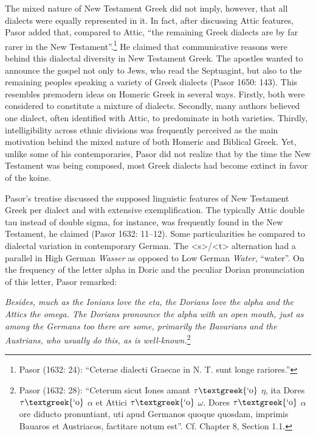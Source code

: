 \begin{styleStandard}
The mixed nature of New Testament Greek did not imply, however, that all dialects were equally represented in it. In fact, after discussing Attic features, Pasor added that, compared to Attic, “the remaining Greek dialects are by far rarer in the New Testament”.\footnote{ Pasor (1632: 24): “Ceterae dialecti Graecae in N. T. sunt longe rariores.”} He claimed that communicative reasons were behind this dialectal diversity in New Testament Greek. The apostles wanted to announce the gospel not only to Jews, who read the Septuagint, but also to the remaining peoples speaking a variety of Greek dialects (Pasor 1650: 143). This resembles premodern ideas on Homeric Greek in several ways. Firstly, both were considered to constitute a mixture of dialects. Secondly, many authors believed one dialect, often identified with Attic, to predominate in both varieties. Thirdly, intelligibility across ethnic divisions was frequently perceived as the main motivation behind the mixed nature of both Homeric and Biblical Greek. Yet, unlike some of his contemporaries, Pasor did not realize that by the time the New Testament was being composed, most Greek dialects had become extinct in favor of the koine.
\end{styleStandard}

\begin{styleStandard}
Pasor’s treatise discussed the supposed linguistic features of New Testament Greek per dialect and with extensive exemplification. The typically Attic double tau instead of double sigma, for instance, was frequently found in the New Testament, he claimed (Pasor 1632: 11–12). Some particularities he compared to dialectal variation in contemporary German. The {\textless}s{\textgreater}/{\textless}t{\textgreater} alternation had a parallel in High German \textit{Wasser} as opposed to Low German \textit{Water}, “water”. On the frequency of the letter alpha in Doric and the peculiar Dorian pronunciation of this letter, Pasor remarked:
\end{styleStandard}

\begin{styleQuote}
\emph{\textup{Besides, much as the Ionians love the eta, the Dorians love the alpha and the Attics the omega. The Dorians pronounce the alpha with an open mouth, just as among the Germans too there are some, primarily the Bavarians and the Austrians, who usually do this, as is well-known.}}\footnote{ Pasor (1632: 28): “Ceterum sicut Iones amant $\tau \text{\textgreek{`o}}$ $\eta $, ita Dores $\tau \text{\textgreek{`o}}$ $\alpha $ et Attici $\tau \text{\textgreek{`o}}$ $\omega $. Dores $\tau \text{\textgreek{`o}}$ $\alpha $ ore diducto pronuntiant, uti apud Germanos quoque quosdam, imprimis Bauaros et Austriacos, factitare notum est”. Cf. Chapter 8, Section 1.1.}
\end{styleQuote}

